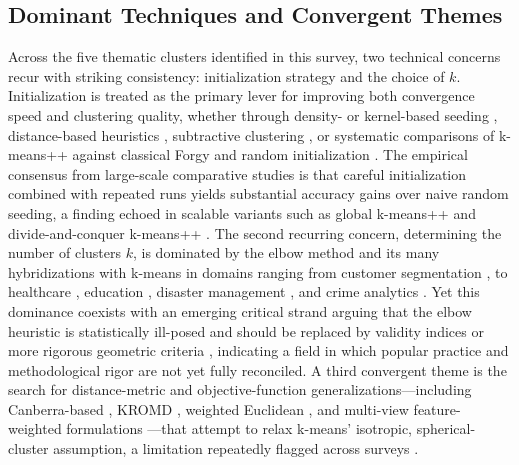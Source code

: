 \subsection{Dominant Techniques and Convergent Themes}
Across the five thematic clusters identified in this survey, two technical concerns recur with striking consistency: initialization strategy and the choice of $k$. Initialization is treated as the primary lever for improving both convergence speed and clustering quality, whether through density- or kernel-based seeding \cite{kumar2017density,kumar2016color}, distance-based heuristics \cite{aldahdooh2013dimk,virmani2015normalization}, subtractive clustering \cite{dhanachandra2015image,tongbram2021segmentation}, or systematic comparisons of k-means++ against classical Forgy and random initialization \cite{li2018experiment,abdillah2025implementation,harris2022extensive,celebi2012comparative}. The empirical consensus from large-scale comparative studies \cite{franti2019how,harris2022extensive} is that careful initialization combined with repeated runs yields substantial accuracy gains over naive random seeding, a finding echoed in scalable variants such as global k-means++ \cite{vardakas2022global} and divide-and-conquer k-means++ \cite{hamalainen2020improving}. The second recurring concern, determining the number of clusters $k$, is dominated by the elbow method and its many hybridizations with k-means in domains ranging from customer segmentation \cite{syakur2018integration,tabianan2022means}, to healthcare \cite{wala2024heart}, education \cite{permadi2023means,ghifari2023clustering}, disaster management \cite{meliyana2025performance,ashari2023analysis}, and crime analytics \cite{sagala2022discovering}. Yet this dominance coexists with an emerging critical strand arguing that the elbow heuristic is statistically ill-posed and should be replaced by validity indices or more rigorous geometric criteria \cite{schubert2023stop,shi2021quantitative,herdiana2026more,ikotun2025cluster}, indicating a field in which popular practice and methodological rigor are not yet fully reconciled. A third convergent theme is the search for distance-metric and objective-function generalizations---including Canberra-based \cite{raeisi2022distance}, KROMD \cite{khan2024addressing}, weighted Euclidean \cite{zhao2021means}, and multi-view feature-weighted formulations \cite{yang2019feature,yang2023unsupervised}---that attempt to relax k-means' isotropic, spherical-cluster assumption, a limitation repeatedly flagged across surveys \cite{oti2021comprehensive,chong2021means,sattarov2023unveiling}.


